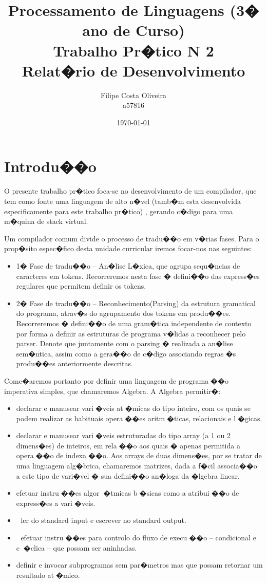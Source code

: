 \documentclass{report}
\title{Processamento de Linguagens (3� ano de Curso)\\ \textbf{Trabalho Pr�tico N 2}\\ Relat�rio de Desenvolvimento}
\author{Filipe Costa Oliveira\\ a57816  }
\date{\today}
\begin{document}
    \maketitle

    \newpage

    \tableofcontents

    \chapter{Introdu��o} \label{intro}

    O presente trabalho pr�tico foca-se no desenvolvimento de  um compilador, que tem como fonte uma linguagem de alto n�vel (tamb�m esta desenvolvida especificamente para este trabalho pr�tico) , gerando c�digo para uma m�quina de stack virtual. \par 
    Um compilador comum divide o processo de tradu��o em v�rias fases. Para o prop�sito espec�fico desta unidade curricular iremos focar-nos nas seguintes:
    \begin{itemize}
    \item 1� Fase de tradu��o -- An�lise L�xica, que agrupa sequ�ncias de caracteres em tokens. Recorreremos nesta fase � defini��o das express�es regulares que permitem definir os tokens.
    \item 2� Fase de tradu��o --  Reconhecimento(Parsing) da estrutura gramatical do programa, atrav�s do agrupamento dos tokens em produ��es. Recorreremos � defini��o de uma gram�tica independente de contexto por forma a definir as estruturas de programa v�lidas a reconhecer pelo parser. Denote que juntamente com o parsing � realizada a an�lise sem�ntica, assim como a gera��o de c�digo associando regras �s produ��es anteriormente descritas.
    \end{itemize} 
    Come�aremos portanto por definir uma linguagem de programa��o imperativa simples, que chamaremos Algebra. A Algebra permitir�:
    \begin{itemize}
    \item declarar e manusear vari�veis at�micas do tipo inteiro, com os quais se podem realizar as habituais opera��es
aritm�ticas, relacionais e l�gicas.
    \item declarar e manusear vari�veis estruturadas do tipo array (a 1 ou 2 dimens�es) de inteiros, em rela��o aos quais  � apenas permitida a opera��o de indexa��o. Aos arrays de duas dimens�es, por se tratar de uma linguagem alg�brica, chamaremos matrizes, dada a f�cil associa��o a este tipo de vari�vel � sua defini��o an�loga da �lgebra linear.
    \item efetuar instru��es algor�tmicas b�sicas como a atribui��o de express�es a vari�veis.
\item ler do standard input e escrever no standard output.
\item  efetuar instru��es para controlo do fluxo de execu��o -- condicional e c�clica -- que possam ser aninhadas.
\item definir e invocar subprogramas sem par�metros mas que possam retornar um resultado at�mico.
    \end{itemize} 
  
\end{document}
